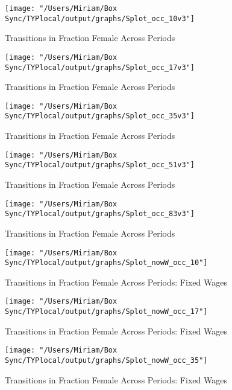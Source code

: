 \documentclass[11pt]{article}
\begin{document}
\begin{figure}[H]
\centering
\caption{Transitions in Fraction Female Across Periods}
\label{transitions10}
\texttt{[image: "/Users/Miriam/Box Sync/TYPlocal/output/graphs/Splot\_occ\_10v3"]}
\end{figure}

\begin{figure}[H]
\centering
\caption{Transitions in Fraction Female Across Periods}
\label{transitions17}
\texttt{[image: "/Users/Miriam/Box Sync/TYPlocal/output/graphs/Splot\_occ\_17v3"]}
\end{figure}

\begin{figure}[H]
\centering
\caption{Transitions in Fraction Female Across Periods}
\label{transitions35}
\texttt{[image: "/Users/Miriam/Box Sync/TYPlocal/output/graphs/Splot\_occ\_35v3"]}
\end{figure}

\begin{figure}[H]
\centering
\caption{Transitions in Fraction Female Across Periods}
\label{transitions51}
\texttt{[image: "/Users/Miriam/Box Sync/TYPlocal/output/graphs/Splot\_occ\_51v3"]}
\end{figure}

\begin{figure}[H]
\centering
\caption{Transitions in Fraction Female Across Periods}
\label{transitions83}
\texttt{[image: "/Users/Miriam/Box Sync/TYPlocal/output/graphs/Splot\_occ\_83v3"]}
\end{figure}

\begin{figure}[H]
\centering
\caption{Transitions in Fraction Female Across Periods: Fixed Wages}
\label{ftransitions10}
\texttt{[image: "/Users/Miriam/Box Sync/TYPlocal/output/graphs/Splot\_nowW\_occ\_10"]}
\end{figure}

\begin{figure}[H]
\centering
\caption{Transitions in Fraction Female Across Periods: Fixed Wages}
\label{ftransitions17}
\texttt{[image: "/Users/Miriam/Box Sync/TYPlocal/output/graphs/Splot\_nowW\_occ\_17"]}
\end{figure}

\begin{figure}[H]
\centering
\caption{Transitions in Fraction Female Across Periods: Fixed Wages}
\label{ftransitions35}
\texttt{[image: "/Users/Miriam/Box Sync/TYPlocal/output/graphs/Splot\_nowW\_occ\_35"]}
\end{figure}
\end{document}
